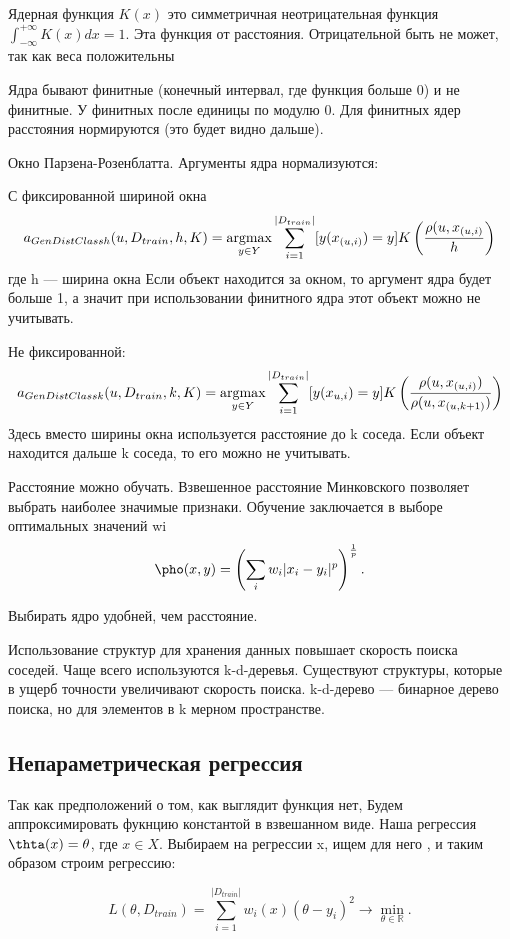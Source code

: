 Ядерная функция $K(x)$ это симметричная неотрицательная функция $\int^{+\infty}_{-\infty} K(x)dx = 1$.
Эта функция от расстояния. Отрицательной быть не может, так как веса положительны


Ядра бывают финитные (конечный интервал, где функция больше 0) и не финитные. У финитных после единицы по модулю 0. Для
финитных ядер расстояния нормируются (это будет видно дальше).

Окно Парзена-Розенблатта. Аргументы ядра нормализуются:

С фиксированной шириной окна
\[
    a_{GenDistClassh}(u, D_{train}, h, K) = \operatorname*{argmax}_{y \in Y}
    \sum^{|D_{train}|}_{i = 1} [y(x_{(u,i)}) = y]
    K \left( \frac{\rho(u, x_{(u, i)}}{h} \right)
\] где h --- ширина окна
Если объект находится за окном, то аргумент ядра будет больше 1, а значит при
использовании финитного ядра этот объект можно не учитывать.

Не фиксированной:
\[
    a_{GenDistClassk}(u, D_{train}, k, K) = \operatorname*{argmax}_{y \in Y}
    \sum^{|D_{train}|}_{i = 1} [y(x_{u, i}) = y] 
    K \left( \frac{\rho(u, x_{(u, i)})}{\rho(u, x_{(u, k+1)})} \right)
\]
Здесь вместо ширины окна используется расстояние до k соседа. Если объект
находится дальше k соседа, то его можно не учитывать.

Расстояние можно обучать. Взвешенное расстояние Минковского позволяет выбрать
наиболее значимые признаки. Обучение заключается в выборе оптимальных значений wi
\[
    \pho(x, y) = \left( \sum_i w_i|x_i - y_i|^p \right)^\frac{1}{p}.
\]

Выбирать ядро удобней, чем расстояние.

Использование структур для хранения данных повышает скорость поиска соседей.
Чаще всего используются k-d-деревья. Существуют структуры, которые в ущерб
точности увеличивают скорость поиска.
k-d-дерево --- бинарное дерево поиска, но для элементов в k мерном пространстве.

\subsection{Непараметрическая регрессия}

Так как предположений о том, как выглядит функция нет, Будем аппроксимировать фукнцию константой в взвешанном виде.
Наша регрессия $\thta(x) = \theta$, где $x \in X$.
Выбираем на регрессии x, ищем для него \theta, и таким образом строим регрессию:

\[
    L(\theta, D_{train}) = \sum^{|D_{train}|}_{i = 1}
    w_i(x)(\theta - y_i)^2 \to \min_{\theta \in \mathbb{R}}.
\]

